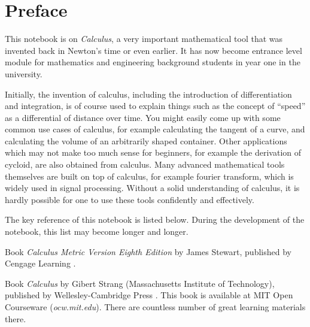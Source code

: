 \chapter*{Preface}

This notebook is on \textit{Calculus}, a very important mathematical tool that was invented back in Newton's time or even earlier. It has now become entrance level module for mathematics and engineering background students in year one in the university.

Initially, the invention of calculus, including the introduction of differentiation and integration, is of course used to explain things such as the concept of ``speed'' as a differential of distance over time. You might easily come up with some common use cases of calculus, for example calculating the tangent of a curve, and calculating the volume of an arbitrarily shaped container. Other applications which may not make too much sense for beginners, for example the derivation of cycloid, are also obtained from calculus. Many advanced mathematical tools themselves are built on top of calculus, for example fourier transform, which is widely used in signal processing. Without a solid understanding of calculus, it is hardly possible for one to use these tools confidently and effectively.

The key reference of this notebook is listed below. During the development of the notebook, this list may become longer and longer.

Book \textit{Calculus Metric Version Eighth Edition} by James Stewart, published by Cengage Learning \cite{stewart2015calculus}.

Book \textit{Calculus} by Gibert Strang (Massachusetts Institute of Technology), published by Wellesley-Cambridge Press \cite{strangt1991calculus}. This book is available at MIT Open Courseware (\textit{ocw.mit.edu}). There are countless number of great learning materials there.